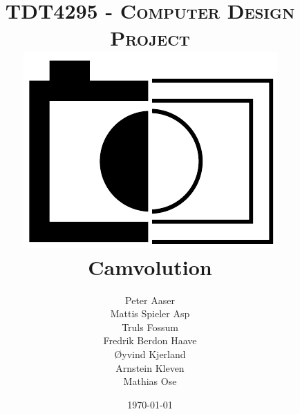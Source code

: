 
\title{
    \textsc{\Large TDT4295 - Computer Design Project}
    \\[0.5cm]
    \includegraphics[scale=0.75]{img/logo_inverted_textless.pdf}
    \\[0.5cm]
    {\huge \bfseries Camvolution}
}

\posttitle{
    ~\\[0.4cm]
    \HRule
    \\[0.4cm]
}

\author{
    Peter Aaser\\
    Mattis Spieler Asp\\
    Truls Fossum\\
    Fredrik Berdon Haave\\
    Øyvind Kjerland\\
    Arnstein Kleven\\
    Mathias Ose
}

\predate{
    ~
    \\[0.4cm]
    \begin{center}
    \large
}

\date{\today}

\postdate{
    \par
    \end{center}
}

\maketitle

